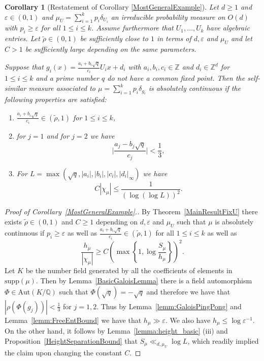 \documentclass[10pt, english,oneside,reqno]{amsart}
\newtheorem*{corollary*}{Corollary}
\theoremstyle{plain}
\theoremstyle{remark}
\numberwithin{equation}{section}
\numberwithin{figure}{section}
\newcommand{\eps}{\varepsilon}
\newcommand{\Z}{\mathbb{Z}}
\newcommand{\Q}{\mathbb{Q}}
\begin{document}
\begin{corollary*}[Restatement of Corollary \ref{MostGeneralExample}]
		Let $d \geq 1$ and $\eps \in (0,1)$ and $\mu_U = \sum_{i = 1}^k p_i\delta_{U_i}$ an irreducible probability measure on $O(d)$ with $p_i \geq \eps$ for all $1\leq i \leq k$. Assume furthermore that $U_1, \ldots , U_k$ have algebraic entries. Let $\tilde{\rho} \in (0,1)$ be sufficiently close to $1$ in terms of $d,\eps$ and $\mu_U$ and let $C > 1$ be sufficiently large depending on the same parameters.  
		
		Suppose that $g_i(x) = \frac{a_i + b_i\sqrt{q}}{c_i}U_ix + d_i$ with $a_i, b_i, c_i \in \Z$ and $d_i \in \Z^d$ for $1 \leq i \leq k$ and a prime number $q$ do not have a common fixed point. Then the self-similar measure associated to $\mu = \sum_{i = 1}^k p_i\delta_{g_i}$ is absolutely continuous if the following properties are satisfied: 
		\begin{enumerate}[label = (\roman*)]
			\item $\frac{a_i + b_i\sqrt{q}}{c_i} \in (\tilde{\rho},1)$ for $1\leq i \leq k$,
			\item for $j = 1$ and for $j = 2$ we have $$\bigg|\frac{a_j - b_j\sqrt{q}}{c_j}\bigg| < \frac{1}{3},$$
			\item For $L = \max(\sqrt{q}, |a_i|, |b_i|, |c_i|, |d_i|_{\infty})$ we have $$C|\chi_{\mu}| \leq \frac{1}{(\log(\log L))^2}.$$
		\end{enumerate}
	\end{corollary*}

\begin{proof}[Proof of Corollary~\ref{MostGeneralExample}.]
    By Theorem~\ref{MainResultFixU} there exists $\tilde{\rho} \in (0,1)$ and $C \geq 1$ depending on $d,\eps$ and $\mu_U$ such that $\mu$ is absolutely continuous if $p_i \geq \eps$ as well as $\frac{a_i + b_i\sqrt{q}}{c_i} \in (\tilde{\rho},1)$ for all $1\leq i \leq k$ as well as $$\frac{h_{\mu}}{|\chi_{\mu}|} \geq  C \left( \max\left\{ 1, \log \frac{S_{\mu}}{h_{\mu}} \right\} \right)^2.$$ Let $K$ be the number field generated by all the coefficients of elements in $\mathrm{supp}(\mu)$. Then by Lemma~\ref{BasicGaloisLemma} there is a field automorphism $\Phi \in \mathrm{Aut}(K/\Q)$ such that $\Phi(\sqrt{q}) = -\sqrt{q}$ and therefore we have that $|\rho(\Phi(g_j))| < \frac{1}{3}$ for $j = 1,2$. Thus by Lemma~\ref{lemm:GaloisPingPong} and Lemma~\ref{lemm:FreeEntBound} we have that $h_{\mu} \gg \eps$. We also have $h_{\mu} \leq \log \eps^{-1}$. On the other hand, it follows by Lemma~\ref{lemma:height_basic} (iii) and Proposition~\ref{HeightSeparationBound} that $S_{\mu} \ll_{d,\mu_U} \log L$, which readily implied the claim upon changing the constant $C$.
\end{proof}
\end{document}
